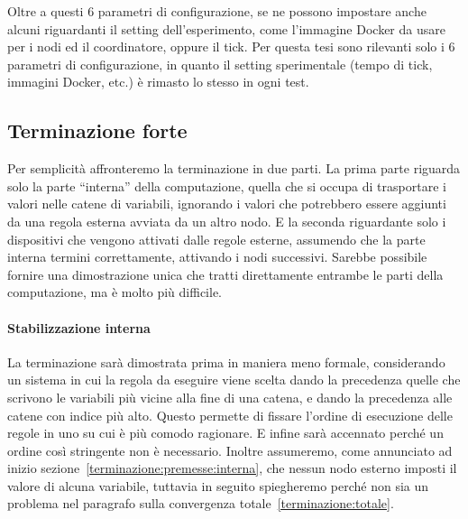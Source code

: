 \documentclass[12pt, a4paper]{article}
\begin{document}
Oltre a questi 6 parametri di configurazione, se ne possono impostare anche alcuni riguardanti il setting dell'esperimento, come l'immagine Docker da usare per i nodi ed il coordinatore, oppure il tick.
Per questa tesi sono rilevanti solo i 6 parametri di configurazione, in quanto il setting sperimentale (tempo di tick, immagini Docker, etc.) è rimasto lo stesso in ogni test.

\subsection{Terminazione forte}

Per semplicità affronteremo la terminazione in due parti. La prima parte riguarda solo la parte ``interna'' della computazione, quella che si occupa di trasportare i valori nelle catene di variabili, ignorando i valori che potrebbero essere aggiunti da una regola esterna avviata da un altro nodo\label{terminazione:premesse:interna}.
E la seconda riguardante solo i dispositivi che vengono attivati dalle regole esterne, assumendo che la parte interna termini correttamente, attivando i nodi successivi\label{terminazione:premesse:esterna}.
Sarebbe possibile fornire una dimostrazione unica che tratti direttamente entrambe le parti della computazione, ma è molto più difficile.

\paragraph{Stabilizzazione interna}\label{terminazione:interna}

La terminazione sarà dimostrata prima in maniera meno formale, considerando un sistema in cui la regola da eseguire viene scelta dando la precedenza quelle che scrivono le variabili più vicine alla fine di una catena, e dando la precedenza alle catene con indice più alto. Questo permette di fissare l'ordine di esecuzione delle regole in uno su cui è più comodo ragionare. E infine sarà accennato perché un ordine così stringente non è necessario.
Inoltre assumeremo, come annunciato ad inizio sezione~\ref{terminazione:premesse:interna}, che nessun nodo esterno imposti il valore di alcuna variabile, tuttavia in seguito spiegheremo perché non sia un problema nel paragrafo sulla convergenza totale~\ref{terminazione:totale}.
\end{document}
